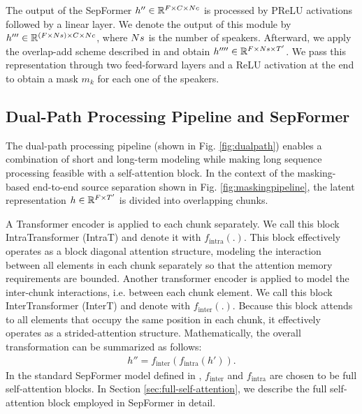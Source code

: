 \documentclass[lettersize,journal]{IEEEtran}
\begin{document}
The output of the SepFormer $h'' \in \mathbb R^{F \times C \times Nc}$ is processed by PReLU activations followed by a linear layer.  
We denote the output of this module by $h''' \in \mathbb R^{(F \times Ns) \times C \times Nc}$, where $Ns$ is the number of speakers. Afterward, we apply the overlap-add scheme described in \cite{luo2020dualpath} and obtain $h''''\in \mathbb R^{F \times Ns \times T'}$. We pass this representation through two feed-forward layers and a ReLU activation at the end to obtain a mask $m_k$ for each one of the speakers.

\subsection{Dual-Path Processing Pipeline and SepFormer}
\label{sec:dppipeline-sepformer}
The dual-path processing pipeline \cite{luo2020dualpath} (shown in Fig. \ref{fig:dualpath}) enables a combination of short and long-term modeling while making long sequence processing feasible with a self-attention block. In the context of the masking-based end-to-end source separation shown in Fig. \ref{fig:maskingpipeline}, the latent representation $h \in \mathbb R^{F \times T'}$ is divided into overlapping chunks. 


A Transformer encoder is applied to each chunk separately. We call this block IntraTransformer (IntraT) and denote it with $f_\text{intra}(.)$. This block effectively operates as a block diagonal attention structure, modeling the interaction between all elements in each chunk separately so that the attention memory requirements are bounded. 
Another transformer encoder is applied to model the inter-chunk interactions, i.e. between each chunk element. We call this block InterTransformer (InterT) and denote with $f_\text{inter}(.)$. 
Because this block attends to all elements that occupy the same position in each chunk, it effectively operates as a strided-attention structure. Mathematically, the overall transformation can be summarized as follows: 
\begin{align}
    h'' = f_\text{inter}( f_\text{intra} ( h') ). 
\end{align}
In the standard SepFormer model defined in \cite{subakan2020attention}, $f_\text{inter}$ and $f_\text{intra}$ are chosen to be full self-attention blocks. In Section \ref{sec:full-self-attention}, we describe the full self-attention block employed in SepFormer in detail. 
\end{document}
